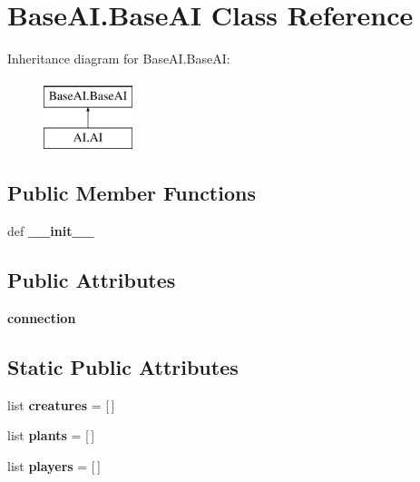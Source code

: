 \hypertarget{classBaseAI_1_1BaseAI}{\section{\-Base\-A\-I.\-Base\-A\-I \-Class \-Reference}
\label{classBaseAI_1_1BaseAI}
}
\-Inheritance diagram for \-Base\-A\-I.\-Base\-A\-I\-:\begin{figure}[H]
\begin{center}
\leavevmode
\includegraphics[height=2.000000cm]{classBaseAI_1_1BaseAI}
\end{center}
\end{figure}
\subsection*{\-Public \-Member \-Functions}
\begin{DoxyCompactItemize}
\item 
\hypertarget{classBaseAI_1_1BaseAI_a540b5cccb5af512159e2d713b2fb7108}{def {\bfseries \-\_\-\-\_\-init\-\_\-\-\_\-}}\label{classBaseAI_1_1BaseAI_a540b5cccb5af512159e2d713b2fb7108}

\end{DoxyCompactItemize}
\subsection*{\-Public \-Attributes}
\begin{DoxyCompactItemize}
\item 
\hypertarget{classBaseAI_1_1BaseAI_a4986a0bdaeb89ac672218d9c4ad5dd26}{{\bfseries connection}}\label{classBaseAI_1_1BaseAI_a4986a0bdaeb89ac672218d9c4ad5dd26}

\end{DoxyCompactItemize}
\subsection*{\-Static \-Public \-Attributes}
\begin{DoxyCompactItemize}
\item 
\hypertarget{classBaseAI_1_1BaseAI_ad4003876ea474908a7513b705bbe1a39}{list {\bfseries creatures} = \mbox{[}$\,$\mbox{]}}\label{classBaseAI_1_1BaseAI_ad4003876ea474908a7513b705bbe1a39}

\item 
\hypertarget{classBaseAI_1_1BaseAI_a822741de5c919832190990801577952c}{list {\bfseries plants} = \mbox{[}$\,$\mbox{]}}\label{classBaseAI_1_1BaseAI_a822741de5c919832190990801577952c}

\item 
\hypertarget{classBaseAI_1_1BaseAI_a7779a8279db0581d9e2df71e6a11c13f}{list {\bfseries players} = \mbox{[}$\,$\mbox{]}}\label{classBaseAI_1_1BaseAI_a7779a8279db0581d9e2df71e6a11c13f}

\end{DoxyCompactItemize}

